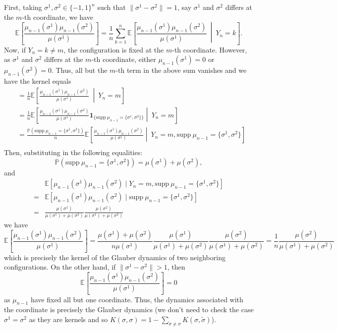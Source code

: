 First, taking \(\sigma^1, \sigma^2 \in \{-1, 1\}^n\) such that \(\|\sigma^1 - \sigma^2\| = 1\), say \(\sigma^1\) 
and \(\sigma^2\) differs at the \(m\)-th coordinate, we have 
\[\mathbb{E}\left[\frac{\mu_{n - 1}(\sigma^1)\mu_{n - 1}(\sigma^2)}{\mu(\sigma^1)}\right] = \frac{1}{n}\sum_{k = 1}^n \mathbb{E}
    \left[\frac{\mu_{n - 1}(\sigma^1)\mu_{n - 1}(\sigma^2)}{\mu(\sigma^1)}\ \middle\vert\ Y_n = k\right].\]
Now, if \(Y_n = k \neq m\), the configuration is fixed at the \(m\)-th coordinate. However, as \(\sigma^1\) and 
\(\sigma^2\) differs at the \(m\)-th coordinate, either \(\mu_{n - 1}(\sigma^1) = 0\) or \(\mu_{n - 1}(\sigma^2) = 0\).
Thus, all but the \(m\)-th term in the above sum vanishes and we have the kernel equals
\begin{align*}
  & = \frac{1}{n} \mathbb{E}\left[\frac{\mu_{n - 1}(\sigma^1)\mu_{n - 1}(\sigma^2)}{\mu(\sigma^1)}\ \middle\vert\ Y_n = m\right]\\
  & = \frac{1}{n} \mathbb{E}\left[\frac{\mu_{n - 1}(\sigma^1)\mu_{n - 1}(\sigma^2)}{\mu(\sigma^1)}
    \mathbf{1}_{\{\text{supp}\ \mu_{n - 1} = \{\sigma^1, \sigma^2\}\}} \middle\vert\ Y_n = m\right]\\
  & = \frac{\mathbb{P}(\text{supp}\ \mu_{n - 1} = \{\sigma^1, \sigma^2\})}{n} 
    \mathbb{E}\left[\frac{\mu_{n - 1}(\sigma^1)\mu_{n - 1}(\sigma^2)}{\mu(\sigma^1)}
    \middle\vert\ Y_n = m, \text{supp}\ \mu_{n - 1} = \{\sigma^1, \sigma^2\}\right]\\
\end{align*}
Then, substituting in the following equalities:
\[\mathbb{P}(\text{supp}\ \mu_{n - 1} = \{\sigma^1, \sigma^2\}) = \mu(\sigma^1) + \mu(\sigma^2),\]
and
\begin{align*}
  & \mathbb{E}[\mu_{n - 1}(\sigma^1)\mu_{n - 1}(\sigma^2) \mid Y_n = m, \text{supp}\ \mu_{n - 1} = \{\sigma^1, \sigma^2\}]\\
  = & \mathbb{E}[\mu_{n - 1}(\sigma^1)\mu_{n - 1}(\sigma^2) \mid \text{supp}\ \mu_{n - 1} = \{\sigma^1, \sigma^2\}]\\
  = & \frac{\mu(\sigma^1)}{\mu(\sigma^1) + \mu(\sigma^2)} \frac{\mu(\sigma^2)}{\mu(\sigma^1) + \mu(\sigma^2)}
\end{align*}
we have 
\[\mathbb{E}\left[\frac{\mu_{n - 1}(\sigma^1)\mu_{n - 1}(\sigma^2)}{\mu(\sigma^1)}\right] =
  \frac{\mu(\sigma^1) + \mu(\sigma^2)}{n\mu(\sigma^1)}
  \frac{\mu(\sigma^1)}{\mu(\sigma^1) + \mu(\sigma^2)} 
  \frac{\mu(\sigma^2)}{\mu(\sigma^1) + \mu(\sigma^2)} = 
  \frac{1}{n} \frac{\mu(\sigma^2)}{\mu(\sigma^1) + \mu(\sigma^2)}\]
which is precisely the kernel of the Glauber dynamics of two neighboring configurations. 
On the other hand, if \(\|\sigma^1 - \sigma^2\| > 1\), then 
\[\mathbb{E}\left[\frac{\mu_{n - 1}(\sigma^1)\mu_{n - 1}(\sigma^2)}{\mu(\sigma^1)}\right] = 0\] 
as \(\mu_{n - 1}\) have fixed all but one coordinate. Thus, the dynamics associated with the coordinate 
is precisely the Glauber dynamics (we don't need to check the case \(\sigma^1 = \sigma^2\) as they are 
kernels and so \(K(\sigma, \sigma) = 1 - \sum_{\tilde \sigma \neq \sigma}K(\sigma, \tilde \sigma)\)).

